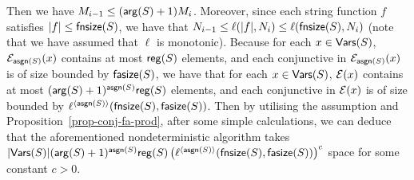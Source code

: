 %		
%
%
%
Then we have $M_{i-1} \le (\mathsf{arg}(S)+1)M_i $. Moreover, since each string function $f$ satisfies   $|f| \le \mathsf{fnsize}(S)$, we have that $N_{i-1} \le \ell(|f|, N_i) \le \ell(\mathsf{fnsize}(S), N_i)$ (note that we have assumed that $\ell$ is monotonic). Because for each $x \in \mathsf{Vars}(S)$, $\mathcal{E}_{\mathsf{asgn}(S)}(x)$ contains at most $\mathsf{reg}(S)$ elements, and 
each conjunctive \FA{} in $\mathcal{E}_{\mathsf{asgn}(S)}(x)$ is of size bounded by $\mathsf{fasize}(S)$, we have that for each $x \in \mathsf{Vars}(S)$, $\mathcal{E}(x)$ contains at most $(\mathsf{arg}(S)+1)^{\mathsf{asgn}(S)}\mathsf{reg}(S)$ elements, and each conjunctive \FA{} in $\mathcal{E}(x)$ is of size bounded by $\ell^{\langle \mathsf{asgn}(S) \rangle}(\mathsf{fnsize}(S), \mathsf{fasize}(S))$. 
Then by utilising  the \prerec{} assumption and Proposition~\ref{prop-conj-fa-prod}, after some simple calculations, we can deduce that the aforementioned nondeterministic algorithm takes 
$|\mathsf{Vars}(S)|(\mathsf{arg}(S)+1)^{\mathsf{asgn}(S)}  \mathsf{reg}(S) \left(\ell^{\langle \mathsf{asgn}(S) \rangle}(\mathsf{fnsize}(S), \mathsf{fasize}(S)) \right)^c$
 space for some constant $c > 0$.
 


